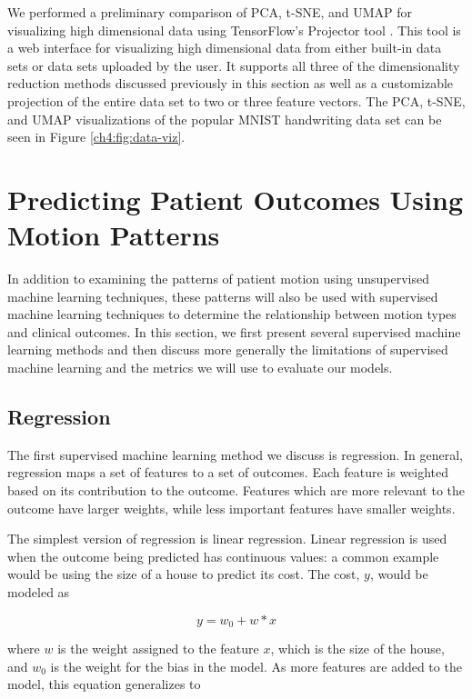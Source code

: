 We performed a preliminary comparison of PCA, t-SNE, and UMAP for visualizing high dimensional data using TensorFlow's Projector tool \cite{TFProjector}. This tool is a web interface for visualizing high dimensional data from either built-in data sets or data sets uploaded by the user. It supports all three of the dimensionality reduction methods discussed previously in this section as well as a customizable projection of the entire data set to two or three feature vectors. The PCA, t-SNE, and UMAP visualizations of the popular MNIST handwriting data set can be seen in Figure \ref{ch4:fig:data-viz}. 

\section{Predicting Patient Outcomes Using Motion Patterns}

In addition to examining the patterns of patient motion using unsupervised machine learning techniques, these patterns will also be used with supervised machine learning techniques to determine the relationship between motion types and clinical outcomes. In this section, we first present several supervised machine learning methods and then discuss more generally the limitations of supervised machine learning and the metrics we will use to evaluate our models.

\subsection{Regression}

The first supervised machine learning method we discuss is regression. In general, regression maps a set of features to a set of outcomes. Each feature is weighted based on its contribution to the outcome. Features which are more relevant to the outcome have larger weights, while less important features have smaller weights. 

The simplest version of regression is linear regression. Linear regression is used when the outcome being predicted has continuous values: a common example would be using the size of a house to predict its cost. The cost, $y$, would be modeled as

\begin{equation}
y = w_0 + w*x
\end{equation}

\noindent where $w$ is the weight assigned to the feature $x$, which is the size of the house, and $w_0$ is the weight for the bias in the model. As more features are added to the model, this equation generalizes to 

